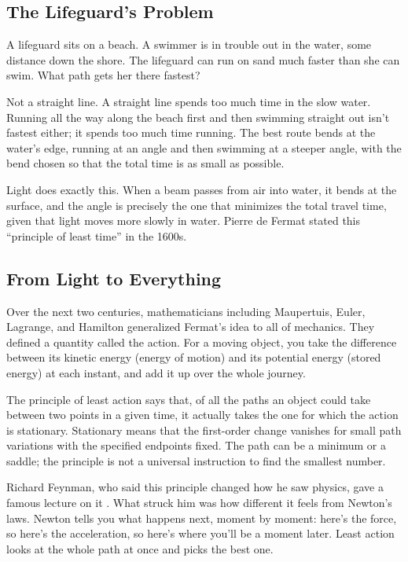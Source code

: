 \subsection{The Lifeguard's Problem}

A lifeguard sits on a beach. A swimmer is in trouble out in the water, some distance down the shore. The lifeguard can run on sand much faster than she can swim. What path gets her there fastest?

Not a straight line. A straight line spends too much time in the slow water. Running all the way along the beach first and then swimming straight out isn't fastest either; it spends too much time running. The best route bends at the water's edge, running at an angle and then swimming at a steeper angle, with the bend chosen so that the total time is as small as possible.

Light does exactly this. When a beam passes from air into water, it bends at the surface, and the angle is precisely the one that minimizes the total travel time, given that light moves more slowly in water. Pierre de Fermat stated this ``principle of least time'' in the 1600s.

\subsection{From Light to Everything}

Over the next two centuries, mathematicians including Maupertuis, Euler, Lagrange, and Hamilton generalized Fermat's idea to all of mechanics. They defined a quantity called the action. For a moving object, you take the difference between its kinetic energy (energy of motion) and its potential energy (stored energy) at each instant, and add it up over the whole journey.

The principle of least action says that, of all the paths an object could take between two points in a given time, it actually takes the one for which the action is stationary. Stationary means that the first-order change vanishes for small path variations with the specified endpoints fixed. The path can be a minimum or a saddle; the principle is not a universal instruction to find the smallest number.

Richard Feynman, who said this principle changed how he saw physics, gave a famous lecture on it \cite{feynmanlectures1964}. What struck him was how different it feels from Newton's laws. Newton tells you what happens next, moment by moment: here's the force, so here's the acceleration, so here's where you'll be a moment later. Least action looks at the whole path at once and picks the best one.


